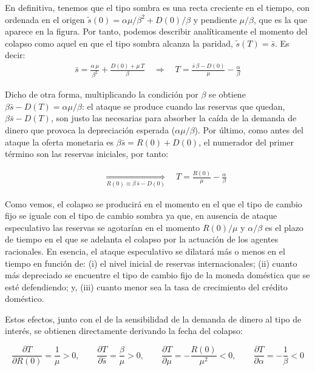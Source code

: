 \documentclass[10pt,a4paper]{article}
\begin{document}
En definitiva, tenemos que el tipo sombra es una recta creciente en el tiempo, con ordenada en el origen $\tilde s(0)=\alpha\mu/\beta^2+D(0)/\beta$ y pendiente $\mu/\beta$, que es la que aparece en la figura. Por tanto, podemos describir analíticamente el momento del colapso como aquel en que el tipo sombra alcanza la paridad, $\tilde s(T)=\bar s$. Es decir:
$$\begin{aligned}
    {\bar s=\frac{\alpha\,\mu}{\beta^2}+\frac{D(0)+\mu\,T}{\beta}}\quad\Longrightarrow\quad{T=\frac{\bar s\,\beta-D(0)}{\mu}-\frac{\alpha}{\beta}}
\end{aligned}$$

Dicho de otra forma, multiplicando la condición por $\beta$ se obtiene $\beta\bar s-D(T)=\alpha\mu/\beta$: el ataque se produce cuando las reservas que quedan, $\beta\bar s-D(T)$, son justo las necesarias para absorber la caída de la demanda de dinero que provoca la depreciación esperada ($\alpha\mu/\beta$). Por último, como antes del ataque la oferta monetaria es $\beta\bar s=R(0)+D(0)$, el numerador del primer término son las reservas iniciales, por tanto:

$$\begin{aligned}
  &\quad\underset{R(0)\equiv\beta\,\bar s-D(0)}{\Longrightarrow}\quad\boxed{T=\frac{R(0)}{\mu}-\frac{\alpha}{\beta}}
\end{aligned}$$

Como vemos, el colapso se producirá en el momento en el que el tipo de cambio fijo se iguale con el tipo de cambio sombra ya que, en ausencia de ataque especulativo las reservas se agotarían en el momento $R(0)/\mu$ y $\alpha/\beta$ es el plazo de tiempo en el que se adelanta el colapso por la actuación de los agentes racionales. En esencia, el ataque especulativo se dilatará más o menos en el tiempo en función de: (i) el nivel inicial de reservas internacionales; (ii) cuanto más depreciado se encuentre el tipo de cambio fijo de la moneda doméstica que se esté defendiendo; y, (iii) cuanto menor sea la tasa de crecimiento del crédito doméstico.

Estos efectos, junto con el de la sensibilidad de la demanda de dinero al tipo de interés, se obtienen directamente derivando la fecha del colapso:

$$\frac{\partial T}{\partial R(0)}=\frac{1}{\mu}>0,\qquad \frac{\partial T}{\partial \bar s}=\frac{\beta}{\mu}>0,\qquad \frac{\partial T}{\partial \mu}=-\frac{R(0)}{\mu^2}<0,\qquad \frac{\partial T}{\partial \alpha}=-\frac{1}{\beta}<0$$
\end{document}
